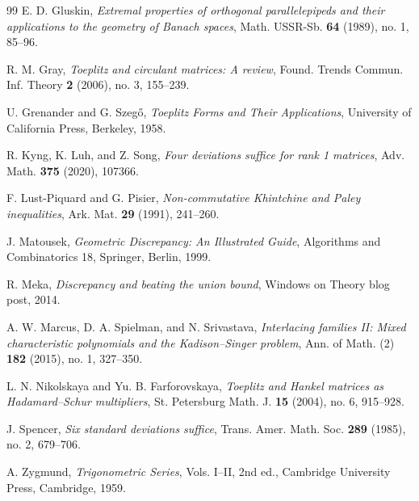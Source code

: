 \begin{thebibliography}{99}
E. D. Gluskin,
\emph{Extremal properties of orthogonal parallelepipeds and their applications to the geometry of Banach spaces},
Math. USSR-Sb. \textbf{64} (1989), no. 1, 85--96.

R. M. Gray,
\emph{Toeplitz and circulant matrices: A review},
Found. Trends Commun. Inf. Theory \textbf{2} (2006), no. 3, 155--239.

U. Grenander and G. Szeg{\H{o}},
\emph{Toeplitz Forms and Their Applications},
University of California Press, Berkeley, 1958.

R. Kyng, K. Luh, and Z. Song,
\emph{Four deviations suffice for rank 1 matrices},
Adv. Math. \textbf{375} (2020), 107366.

F. Lust-Piquard and G. Pisier,
\emph{Non-commutative Khintchine and Paley inequalities},
Ark. Mat. \textbf{29} (1991), 241--260.

J. Matousek,
\emph{Geometric Discrepancy: An Illustrated Guide},
Algorithms and Combinatorics 18, Springer, Berlin, 1999.

R. Meka,
\emph{Discrepancy and beating the union bound},
Windows on Theory blog post, 2014.

A. W. Marcus, D. A. Spielman, and N. Srivastava,
\emph{Interlacing families II: Mixed characteristic polynomials and the Kadison--Singer problem},
Ann. of Math. (2) \textbf{182} (2015), no. 1, 327--350.

L. N. Nikolskaya and Yu. B. Farforovskaya,
\emph{Toeplitz and Hankel matrices as Hadamard--Schur multipliers},
St. Petersburg Math. J. \textbf{15} (2004), no. 6, 915--928.

J. Spencer,
\emph{Six standard deviations suffice},
Trans. Amer. Math. Soc. \textbf{289} (1985), no. 2, 679--706.

A. Zygmund,
\emph{Trigonometric Series}, Vols. I--II, 2nd ed.,
Cambridge University Press, Cambridge, 1959.

\end{thebibliography}


